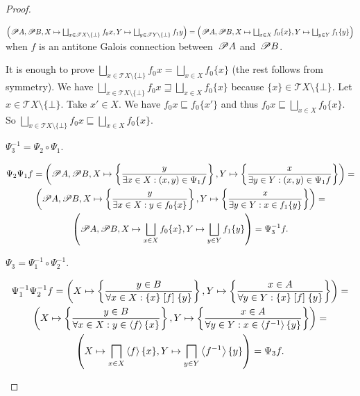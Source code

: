 \begin{proof}
\begin{flushleft}
\begin{claim}
$\left(\subsets A,\subsets B,X\mapsto\bigsqcup_{x\in\mathscr{T}X\setminus\{\bot\}}f_0 x,Y\mapsto\bigsqcup_{y\in\mathscr{T}Y\setminus\{\bot\}}f_1 y\right) =
\left(\subsets A,\subsets B,X\mapsto\bigsqcup_{x\in X}f_0\{x\},Y\mapsto\bigsqcup_{y\in Y}f_1\{y\}\right)$
when $f$ is an antitone Galois connection between~$\mathscr{P} A$ and~$\mathscr{P} B$.
\end{claim}
\end{flushleft}
\begin{claimproof}
It is enough to prove $\bigsqcup_{x\in\mathscr{T}X\setminus\{\bot\}}f_0 x=\bigsqcup_{x\in X}f_0\{x\}$ (the rest follows from symmetry).
We have $\bigsqcup_{x\in\mathscr{T}X\setminus\{\bot\}}f_0 x\sqsupseteq\bigsqcup_{x\in X}f_0\{x\}$ because $\{x\}\in\mathscr{T}X\setminus\{\bot\}$.
Let $x\in\mathscr{T}X\setminus\{\bot\}$. Take $x'\in X$. We have $f_0 x\sqsubseteq f_0\{x'\}$ and thus
$f_0 x\sqsubseteq \bigsqcup_{x\in X}f_0\{x\}$. So $\bigsqcup_{x\in\mathscr{T}X\setminus\{\bot\}}f_0 x\sqsubseteq\bigsqcup_{x\in X}f_0\{x\}$.
\end{claimproof}

\begin{claim}
$\Psi_3^{-1} = \Psi_2\circ\Psi_1$.
\end{claim}
\begin{claimproof}
\begin{multline*}
\Psi_2\Psi_1 f = \left(\subsets A,\subsets B,X\mapsto\setcond{y}{\exists x\in X:(x,y)\in\Psi_1 f},Y\mapsto\setcond{x}{\exists y\in Y:(x,y)\in\Psi_1 f}\right) =\\
\left(\subsets A,\subsets B,X\mapsto\setcond{y}{\exists x\in X:y\in f_0\{x\}},Y\mapsto\setcond{x}{\exists y\in Y:x\in f_1\{y\}}\right) =\\
\left(\subsets A,\subsets B,X\mapsto\bigsqcup_{x\in X}f_0\{x\},Y\mapsto\bigsqcup_{y\in Y}f_1\{y\}\right) =
\Psi_3^{-1} f.
\end{multline*}
\end{claimproof}

\begin{claim}
$\Psi_3 = \Psi_1^{-1}\circ\Psi_2^{-1}$.
\end{claim}
\begin{claimproof}
\begin{multline*}
\Psi_1^{-1}\Psi_2^{-1} f = 
\left(X\mapsto\left\{ \frac{y\in B}{\forall x\in X:\{x\}\mathrel{\left[f\right]}\{y\}}\right\}, Y\mapsto\left\{ \frac{x\in A}{\forall y\in Y:\{x\}\mathrel{\left[f\right]}\{y\}}\right\}\right) = \\
\left(X\mapsto\left\{ \frac{y\in B}{\forall x\in X:y\in\left\langle f\right\rangle\{x\}}\right\}, Y\mapsto\left\{ \frac{x\in A}{\forall y\in Y:x\in\left\langle f^{-1}\right\rangle\{y\}}\right\}\right) = \\
\left(X\mapsto\bigsqcap_{x\in X}\left\langle f\right\rangle\{x\},Y\mapsto\bigsqcap_{y\in Y}\left\langle f^{-1}\right\rangle\{y\}\right) = \Psi_3 f.
\end{multline*}
\end{claimproof}


\end{proof}
